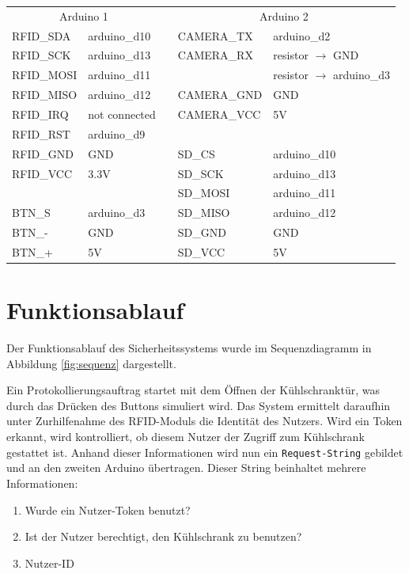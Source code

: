 \documentclass[a4paper, 11pt]{article}
\begin{document}
\begin{table}[htb]
\begin{tabular}{@{}lllll@{}}
\toprule
\multicolumn{2}{c}{Arduino 1} &  & \multicolumn{2}{c}{Arduino 2}                    \\ \cmidrule(r){1-2} \cmidrule(l){4-5} 
RFID\_SDA    & arduino\_d10   &  & CAMERA\_TX  & arduino\_d2                        \\
RFID\_SCK    & arduino\_d13   &  & CAMERA\_RX  & resistor $\rightarrow$ GND         \\
RFID\_MOSI   & arduino\_d11   &  &             & resistor $\rightarrow$ arduino\_d3 \\
RFID\_MISO   & arduino\_d12   &  & CAMERA\_GND & GND                                \\
RFID\_IRQ    & not connected  &  & CAMERA\_VCC & 5V                                 \\
RFID\_RST    & arduino\_d9    &  &             &                                    \\ 
RFID\_GND    & GND            &  & SD\_CS      & arduino\_d10                       \\
RFID\_VCC    & 3.3V           &  & SD\_SCK     & arduino\_d13                       \\
                &                &  & SD\_MOSI    & arduino\_d11                       \\
BTN\_S       & arduino\_d3    &  & SD\_MISO    & arduino\_d12                       \\
BTN\_-       & GND            &  & SD\_GND     & GND                                \\
BTN\_+       & 5V             &  & SD\_VCC     & 5V                                 \\ \bottomrule
\end{tabular}
\end{table}


\section{Funktionsablauf}
Der Funktionsablauf des Sicherheitssystems wurde im Sequenzdiagramm in Abbildung \ref{fig:sequenz} dargestellt.

Ein Protokollierungsauftrag startet mit dem Öffnen der Kühlschranktür, was durch das Drücken des Buttons simuliert wird. Das System ermittelt daraufhin unter Zurhilfenahme des RFID-Moduls die Identität des Nutzers. Wird ein Token erkannt, wird kontrolliert, ob diesem Nutzer der Zugriff zum Kühlschrank gestattet ist. Anhand dieser Informationen wird nun ein \texttt{Request-String} gebildet und an den zweiten Arduino übertragen. Dieser String beinhaltet mehrere Informationen:
\begin{enumerate}
\item Wurde ein Nutzer-Token benutzt?
\item Ist der Nutzer berechtigt, den Kühlschrank zu benutzen?
\item Nutzer-ID
\end{enumerate}
\end{document}

